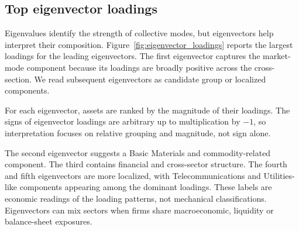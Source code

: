 \subsection{Top eigenvector loadings}

Eigenvalues identify the strength of collective modes, but eigenvectors help interpret their composition. Figure~\ref{fig:eigenvector_loadings} reports the largest loadings for the leading eigenvectors. The first eigenvector captures the market-mode component because its loadings are broadly positive across the cross-section. We read subsequent eigenvectors as candidate group or localized components.

For each eigenvector, assets are ranked by the magnitude of their loadings. The signs of eigenvector loadings are arbitrary up to multiplication by $-1$, so interpretation focuses on relative grouping and magnitude, not sign alone.

The second eigenvector suggests a Basic Materials and commodity-related component. The third contains financial and cross-sector structure. The fourth and fifth eigenvectors are more localized, with Telecommunications and Utilities-like components appearing among the dominant loadings. These labels are economic readings of the loading patterns, not mechanical classifications. Eigenvectors can mix sectors when firms share macroeconomic, liquidity or balance-sheet exposures.
